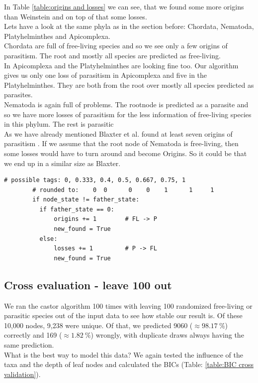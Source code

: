       In Table \ref{table:origins and losses} we can see, that we found some more origins than Weinstein 
        and on top of that some losses. \\
      
      Lets have a look at the same phyla as in the section before: Chordata, Nematoda, 
        Platyhelminthes and Apicomplexa. \\
      Chordata are full of free-living species and so we see only a few origins of parasitism. The root
      and mostly all species are predicted as free-living. \\
      In Apicomplexa and the Platyhelminthes are looking fine too. Our algorithm gives us only one loss 
        of parasitism in Apicomplexa and five in the Platyhelminthes. They are both from the root over 
        mostly all species predicted as parasites. \\
      Nematoda is again full of problems. The rootnode is predicted as a parasite and so we have more 
        losses of parasitism for the less information of free-living species in this phylum. The rest 
        is parasitic \\
        As we have already mentioned Blaxter et al. found at least seven origins of parasitism 
          \cite{Blaxter1998}. If we assume that the root node of Nematoda is free-living, then some 
          losses would have to turn around and become Origins. So it could be that we end up in a similar 
          size as Blaxter.

      \begin{lstlisting}[gobble=6]
        # possible tags: 0, 0.333, 0.4, 0.5, 0.667, 0.75, 1
        # rounded to:    0  0      0    0    1      1     1
        if node_state != father_state:
          if father_state == 0:
              origins += 1        # FL -> P
              new_found = True
          else:
              losses += 1         # P -> FL
              new_found = True
      \end{lstlisting}

      
    \subsection{Cross evaluation - leave 100 out}
      We ran the castor algorithm 100 times with leaving 100 randomized free-living or parasitic species 
        out of the input data to see how stable our result is. Of these 10,000 nodes, 9,238 were unique. 
        Of that, we predicted 9060 ($\approx 98.17~\%$) correctly and 169 ($\approx 1.82~\%$) wrongly, with 
        duplicate draws always having the same prediction. \\
      What is the best way to model this data? We again tested the influence of the taxa and the depth of 
        leaf nodes and calculated the BICs (Table: \ref{table:BIC cross validation}).


